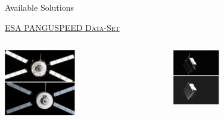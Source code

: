 \documentclass[10pt]{beamer}
\begin{document}
\begin{frame}{Available Solutions}

  \bigskip

  \begin{overlayarea}{\textwidth}{0.8\textheight}

  \centering

  \textsc{\ul{ESA PANGU}}\hspace{2.8cm}\textsc{\ul{SPEED Data-Set}}
  
  \begin{columns}[T,onlytextwidth]
    \hspace{1.6cm}
    \begin{column}{0.5\textwidth}
    \includegraphics[width=0.45\textwidth]{gfx/pangu3.eps}
    \end{column}
    \hspace{-0.78cm}
    \begin{column}{0.5\textwidth}

    \includegraphics[width=0.35\textwidth]{gfx/speed.eps}
    

    
    \end{column}
  \end{columns}


\end{overlayarea}
\end{frame}
\end{document}
